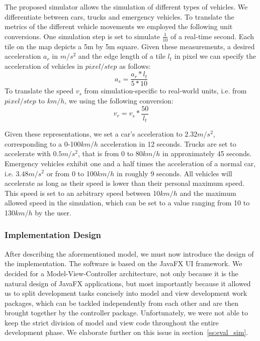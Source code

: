 The proposed simulator allows the simulation of different types of vehicles. We differentiate between cars, trucks and emergency vehicles. To translate the metrics of the different vehicle movements we employed the following unit conversions. One simulation step is set to simulate $\frac{1}{10}$ of a real-time second. Each tile on the map depicts a 5m by 5m square. Given these measurements, a desired acceleration $a_r$ in $m/s^2$ and the edge length of a tile $l_t$ in pixel we can specify the acceleration of vehicles in $pixel/step$ as follows:
	\begin{equation}\label{for:acceleration}	
		a_s = \frac{a_r * l_t}{5 * 10}
	\end{equation}
	To translate the speed $v_s$ from simulation-specific to real-world units, i.e. from $pixel/step$ to $km/h$, we using the following conversion:
	\begin{equation}\label{for:speed}
		v_r = v_s * \frac{50}{l_t} 
	\end{equation}
	
Given these representations, we set a car's acceleration to $2.32m/s^2$, corresponding to a 0-100$km/h$ acceleration in 12 seconds. Trucks are set to accelerate with $0.5m/s^2$, that is from 0 to 80$km/h$ in approximately 45 seconds. Emergency vehicles exhibit 	one and a half times the acceleration of a normal car, i.e. $3.48m/s^2$ or from 0 to 100$km/h$ in roughly 9 seconds. All vehicles will accelerate as long as their speed is lower than their personal maximum speed. This speed is set to an arbitrary speed between 10$km/h$ and the maximum allowed speed in the simulation, which can be set to a value ranging from 10 to 130$km/h$ by the user.

\subsubsection*{Implementation Design}
	
After describing the aforementioned model, we must now introduce the design of the implementation. The software is based on the JavaFX UI framework. We decided for a Model-View-Controller architecture, not only because it is the natural design of JavaFX applications, but most importantly because it allowed us to split development tasks concisely into model and view development work packages, which can be tackled independently from each other and are then brought together by the controller package. Unfortunately, we were not able to keep the strict division of model and view code throughout the entire development phase. We elaborate further on this issue in section~\ref{ss:eval_sim}. 

